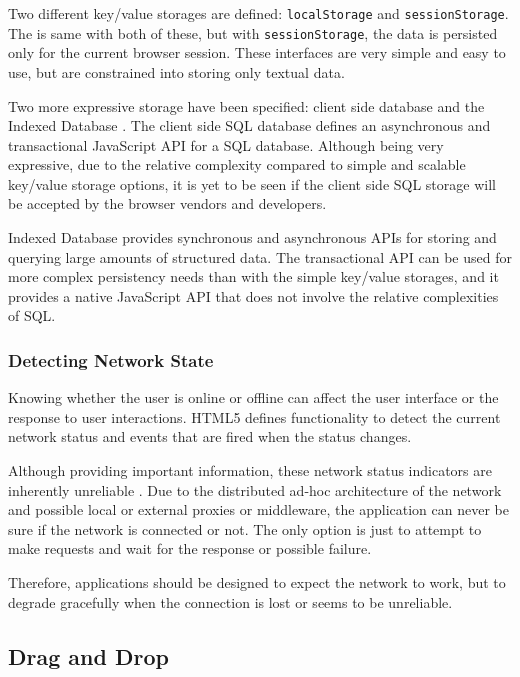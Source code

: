 Two different key/value storages are defined: \texttt{localStorage}
and \texttt{sessionStorage}. The  is same with both of
these, but with \texttt{sessionStorage}, the data is persisted only
for the current browser session. These interfaces are very simple and
easy to use, but are constrained into storing only textual
data. \cite{webstoragedraft}

Two more expressive storage  have been specified: client
side  database \cite{webstoragedraft} and the Indexed
Database \cite{indexedDBdraft}. The client side SQL database defines
an asynchronous and transactional JavaScript API for a SQL
database. Although being very expressive, due to the relative
complexity compared to simple and scalable key/value storage options,
it is yet to be seen if the client side SQL storage will be accepted
by the browser vendors and developers.

Indexed Database provides synchronous and asynchronous APIs for
storing and querying large amounts of structured data. The
transactional API can be used for more complex persistency needs than
with the simple key/value storages, and it provides a native
JavaScript API that does not involve the relative complexities of SQL.

\subsubsection{Detecting Network State}

Knowing whether the user is online or offline can affect the user
interface or the response to user interactions. HTML5 defines
functionality to detect the current network status and events that are
fired when the status changes. \cite{HTML5draft}

Although providing important information, these network status
indicators are inherently unreliable \cite{HTML5draft}. Due to the
distributed ad-hoc architecture of the network and possible local or
external proxies or middleware, the application can never be sure if
the network is connected or not. The only option is just to attempt to
make requests and wait for the response or possible failure.

Therefore, applications should be designed to expect the network to
work, but to degrade gracefully when the connection is lost or seems
to be unreliable.

\subsection{Drag and Drop}
\label{section:dragdrop}

